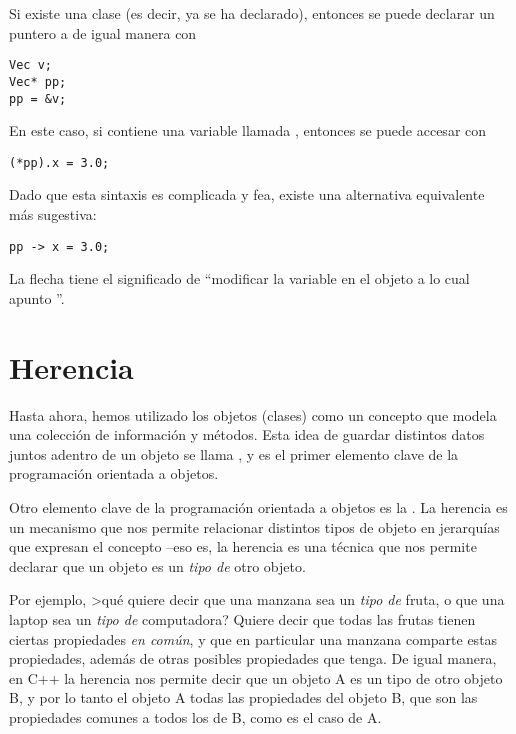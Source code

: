 Si existe una clase  (es decir, ya se ha declarado), entonces se puede declarar un puntero a  de igual manera con
\begin{lstlisting}
Vec v;
Vec* pp;
pp = &v;
\end{lstlisting}
En este caso, si  contiene una variable llamada , entonces se puede accesar con
\begin{lstlisting}
(*pp).x = 3.0;
\end{lstlisting}
Dado que esta sintaxis es complicada y fea, existe una alternativa equivalente más sugestiva:
\begin{lstlisting}
pp -> x = 3.0;
\end{lstlisting}
La flecha tiene el significado de ``modificar la variable  en el objeto a lo cual apunto ''.

\section{Herencia}

Hasta ahora, hemos utilizado los objetos (clases) como un concepto que modela una colección de información y métodos. 
Esta idea de guardar distintos datos juntos adentro de un objeto se llama , y es el primer elemento clave de la programación orientada a objetos.

Otro elemento clave de la programación orientada a objetos es la . La herencia es un mecanismo que nos permite relacionar distintos tipos de objeto en jerarquías que expresan el concepto  --eso es, la herencia es una técnica que nos permite declarar que un objeto es un \emph{tipo de} otro objeto. 

Por ejemplo, >qué quiere decir que una manzana sea un \emph{tipo de} fruta, o que una laptop sea un \emph{tipo de} computadora? Quiere decir
que todas las frutas tienen ciertas propiedades \emph{en común}, y que en particular una manzana comparte estas propiedades, además de otras posibles propiedades que tenga. De igual manera, en C++ la herencia nos permite decir que un objeto A es un tipo de otro objeto B, y por lo tanto el objeto A  todas las propiedades del objeto B, que son las propiedades comunes a todos los  de B, como es el caso de A.

